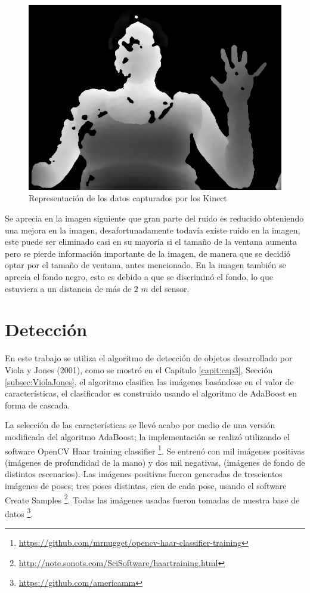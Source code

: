 \begin{figure}[h!]
\begin{center}
\includegraphics[scale=.35]{./Figures/166_W13.png}
\end{center}
\caption{Representación de los datos capturados por los Kinect}
\label{fig:ImagenCapturadaNoNoise}
\end{figure}  

Se aprecia en la imagen siguiente  que gran parte del ruido es reducido obteniendo una mejora en la imagen, desafortunadamente todavía existe ruido en la imagen, este puede ser eliminado casi en su mayoría  si el tamaño de la ventana aumenta pero se pierde información importante de la imagen, de manera que se decidió optar por el tamaño de ventana, antes mencionado. En la imagen también se aprecia el fondo negro, esto es debido a que se discrimin\'o el fondo, lo que estuviera a un distancia de más de $2$ $m$ del sensor. 



\section{Detección}\label{sec:DeteccionSystem} 

En este trabajo se utiliza el algoritmo de detección de objetos desarrollado por Viola y Jones (2001), como se mostró en el Cap\'itulo \ref{capit:cap3}, Sección \ref{subsec:ViolaJones}, el algoritmo clasifica las imágenes basándose en el valor de características, el clasificador es construido usando el algoritmo de AdaBoost en forma de cascada. 


La selección de las características se llev\'o acabo por medio de una versión modificada del algoritmo AdaBoost; la implementaci\'on se realiz\'o utilizando el software OpenCV Haar training classifier \footnote{\url{https://github.com/mrnugget/opencv-haar-classifier-training}}. Se entren\'o con mil imágenes positivas (imágenes de profundidad de la mano) y dos mil negativas, (imágenes de fondo de distintos escenarios). Las imágenes positivas fueron generadas de trescientos imágenes de poses; tres poses distintas, cien de cada pose, usando el software Create Samples \footnote{\url{http://note.sonots.com/SciSoftware/haartraining.html}}. Todas las imágenes usadas fueron tomadas de nuestra base de  datos \footnote{\label{myrepo} \url{https://github.com/americamm}}.

